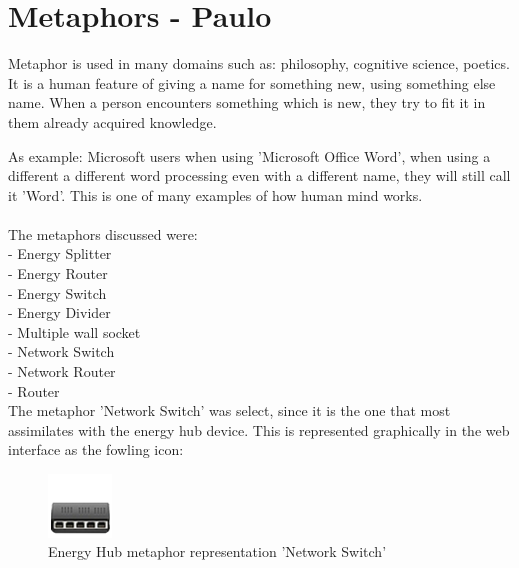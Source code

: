 \section{Metaphors - Paulo}

Metaphor is used in many domains such as: philosophy, cognitive science, poetics. It is a human feature of giving a name for something new, using something else name. When a person encounters something which is new, they try to fit it in them already acquired knowledge. 

As example: Microsoft users when using 'Microsoft Office Word', when using a different a different word processing even with a different name, they will still call it 'Word'. This is one of many examples of how human mind works.\\
\\
The metaphors discussed were:\\
- Energy Splitter \\
- Energy Router \\
- Energy Switch \\
- Energy Divider \\
- Multiple wall socket \\
- Network Switch \\
- Network Router \\
- Router \\

The metaphor 'Network Switch' was select, since it is the one that most assimilates with the energy hub device. This is represented graphically in the web interface as the fowling icon:

\begin{figure}[H]
	\center
	\includegraphics[width=0.15\textwidth]{images/dock_hub.png}
   	\caption{Energy Hub metaphor representation 'Network Switch'}
\end{figure}







